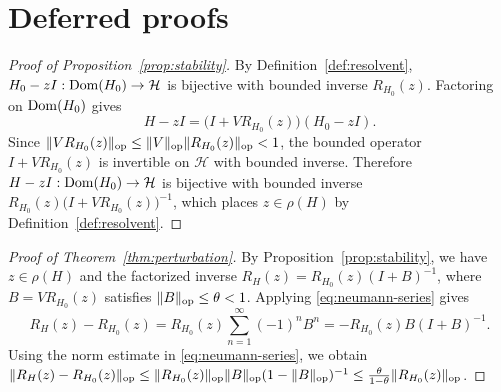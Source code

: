 \section{Deferred proofs}
\label{sec:proofs}

\begin{proof}[Proof of Proposition~\ref{prop:stability}]
By Definition~\ref{def:resolvent}, $H_0 - zI : \operatorname{Dom}(H_0) \to \mathcal{H}$ is
bijective with bounded inverse $R_{H_0}(z)$. Factoring on $\operatorname{Dom}(H_0)$ gives
\[
H - zI = \bigl(I + V R_{H_0}(z)\bigr)(H_0 - zI).
\]
Since $\|V R_{H_0}(z)\|_{\mathrm{op}} \le \|V\|_{\mathrm{op}}\|R_{H_0}(z)\|_{\mathrm{op}} < 1$, the
bounded operator $I + V R_{H_0}(z)$ is invertible on $\mathcal{H}$ with
bounded inverse. Therefore $H - zI : \operatorname{Dom}(H_0) \to \mathcal{H}$ is bijective
with bounded inverse $R_{H_0}(z)\bigl(I + V R_{H_0}(z)\bigr)^{-1}$, which
places $z \in \rho(H)$ by Definition~\ref{def:resolvent}.
\end{proof}

\begin{proof}[Proof of Theorem~\ref{thm:perturbation}]
By Proposition~\ref{prop:stability}, we have $z \in \rho(H)$ and the
factorized inverse $R_H(z) = R_{H_0}(z)(I + B)^{-1}$, where $B = V R_{H_0}(z)$
satisfies $\|B\|_{\mathrm{op}} \le \theta < 1$. Applying \eqref{eq:neumann-series}
gives
\[
R_H(z) - R_{H_0}(z) = R_{H_0}(z)\sum_{n=1}^{\infty} (-1)^n B^n
= - R_{H_0}(z) B (I + B)^{-1}.
\]
Using the norm estimate in \eqref{eq:neumann-series}, we obtain
$\|R_H(z) - R_{H_0}(z)\|_{\mathrm{op}} \le \|R_{H_0}(z)\|_{\mathrm{op}} \|B\|_{\mathrm{op}} (1 - \|B\|_{\mathrm{op}})^{-1}
\le \frac{\theta}{1 - \theta}\|R_{H_0}(z)\|_{\mathrm{op}}$.
\end{proof}
